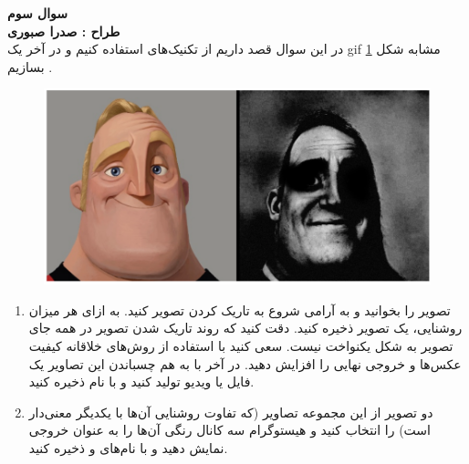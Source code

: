 \documentclass[a4paper]{article}
\begin{document}
\textbf{\LARGE
	سوال سوم
}
\\
\textbf{طراح :‌ صدرا صبوری}
\\
در این سوال قصد داریم از تکنیک‌های 
 استفاده کنیم و در آخر یک gif مشابه شکل 
 \ref{Traumatized Mr.Incredible}
 بسازیم
 .
\begin{figure}[H]
	\centering
	\includegraphics[width=0.5 \linewidth]{images/Q6_1.png}
	\caption{}
	\label{Traumatized Mr.Incredible}
\end{figure}  
\begin{enumerate}
	\item 
تصویر 
 را بخوانید و به آرامی شروع به تاریک کردن تصویر کنید. 
  به ازای هر میزان روشنایی، یک تصویر ذخیره کنید. دقت کنید که روند تاریک شدن تصویر در همه جای تصویر به شکل یکنواخت نیست. سعی کنید با استفاده از روش‌های خلاقانه کیفیت عکس‌ها و خروجی نهایی را افزایش دهید. در آخر با به هم چسباندن این تصاویر یک فایل 
 یا ویدیو تولید کنید و با نام 
 ذخیره کنید.
 \item
دو تصویر از این مجموعه تصاویر (که تفاوت روشنایی آن‌ها با یکدیگر معنی‌دار است) را انتخاب کنید و هیستوگرام سه کانال رنگی آن‌ها را به عنوان خروجی نمایش دهید و با نام‌های 
و 
ذخیره کنید.
\end{enumerate}
\end{document}
